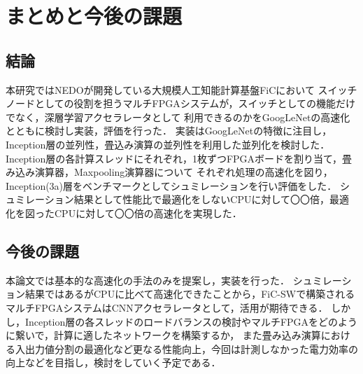\chapter{まとめと今後の課題}
{
\label{chap:conclusion}
\section{結論}
\label{sec:conclusion}
本研究ではNEDOが開発している大規模人工知能計算基盤FiCにおいて
スイッチノードとしての役割を担うマルチFPGAシステムが，スイッチとしての機能だけでなく，深層学習アクセラレータとして
利用できるのかをGoogLeNetの高速化とともに検討し実装，評価を行った．
実装はGoogLeNetの特徴に注目し，Inception層の並列性，畳込み演算の並列性を利用した並列化を検討した．
Inception層の各計算スレッドにそれぞれ，1枚ずつFPGAボードを割り当て，畳み込み演算器，Maxpooling演算器について
それぞれ処理の高速化を図り，Inception(3a)層をベンチマークとしてシュミレーションを行い評価をした．
シュミレーション結果として性能比で最適化をしないCPUに対して〇〇倍，最適化を図ったCPUに対して〇〇倍の高速化を実現した．

\section{今後の課題}
\label{sec:future}
本論文では基本的な高速化の手法のみを提案し，実装を行った．
シュミレーション結果ではあるがCPUに比べて高速化できたことから，FiC-SWで構築される
マルチFPGAシステムはCNNアクセラレータとして，活用が期待できる．
しかし，Inception層の各スレッドのロードバランスの検討やマルチFPGAをどのように繋いで，計算に適したネットワークを構築するか，
また畳み込み演算における入出力値分割の最適化など更なる性能向上，今回は計測しなかった電力効率の向上などを目指し，検討をしていく予定である．
}
